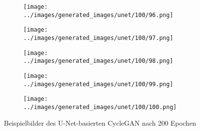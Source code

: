 \begin{figure}[H]
\hspace{1em}%
\begin{subfigure}[b]{0.1\textwidth}
\centering
\texttt{[image: ../images/generated\_images/unet/100/96.png]}
\end{subfigure}
\hspace{1em}%
\begin{subfigure}[b]{0.1\textwidth}
\centering
\texttt{[image: ../images/generated\_images/unet/100/97.png]}
\end{subfigure}
\hspace{1em}%
\begin{subfigure}[b]{0.1\textwidth}
\centering
\texttt{[image: ../images/generated\_images/unet/100/98.png]}
\end{subfigure}
\hspace{1em}%
\begin{subfigure}[b]{0.1\textwidth}
\centering
\texttt{[image: ../images/generated\_images/unet/100/99.png]}
\end{subfigure}
\hspace{1em}%
\begin{subfigure}[b]{0.1\textwidth}
\centering
\texttt{[image: ../images/generated\_images/unet/100/100.png]}
\end{subfigure}
     \caption{Beispielbilder des U-Net-basierten \ac{CycleGAN} nach 200 Epochen}
     \label{fig:unet-imgs}
\end{figure}

